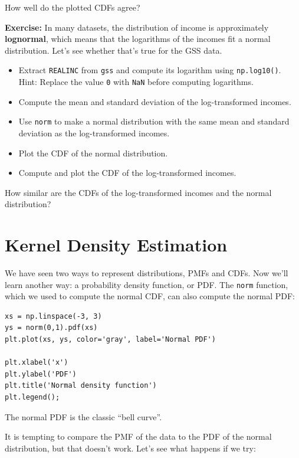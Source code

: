 How well do the plotted CDFs agree?

\textbf{Exercise:} In many datasets, the distribution of income is
approximately \textbf{lognormal}, which means that the logarithms of the
incomes fit a normal distribution. Let's see whether that's true for the
GSS data.

\begin{itemize}
\item
  Extract \passthrough{\lstinline!REALINC!} from
  \passthrough{\lstinline!gss!} and compute its logarithm using
  \passthrough{\lstinline!np.log10()!}. Hint: Replace the value
  \passthrough{\lstinline!0!} with \passthrough{\lstinline!NaN!} before
  computing logarithms.
\item
  Compute the mean and standard deviation of the log-transformed
  incomes.
\item
  Use \passthrough{\lstinline!norm!} to make a normal distribution with
  the same mean and standard deviation as the log-transformed incomes.
\item
  Plot the CDF of the normal distribution.
\item
  Compute and plot the CDF of the log-transformed incomes.
\end{itemize}

How similar are the CDFs of the log-transformed incomes and the normal
distribution?

\hypertarget{kernel-density-estimation}{%
\section{Kernel Density Estimation}\label{kernel-density-estimation}}

We have seen two ways to represent distributions, PMFs and CDFs. Now
we'll learn another way: a probability density function, or PDF. The
\passthrough{\lstinline!norm!} function, which we used to compute the
normal CDF, can also compute the normal PDF:

\begin{lstlisting}[]
xs = np.linspace(-3, 3)
ys = norm(0,1).pdf(xs)
plt.plot(xs, ys, color='gray', label='Normal PDF')

plt.xlabel('x')
plt.ylabel('PDF')
plt.title('Normal density function')
plt.legend();
\end{lstlisting}

The normal PDF is the classic ``bell curve''.

It is tempting to compare the PMF of the data to the PDF of the normal
distribution, but that doesn't work. Let's see what happens if we try:

